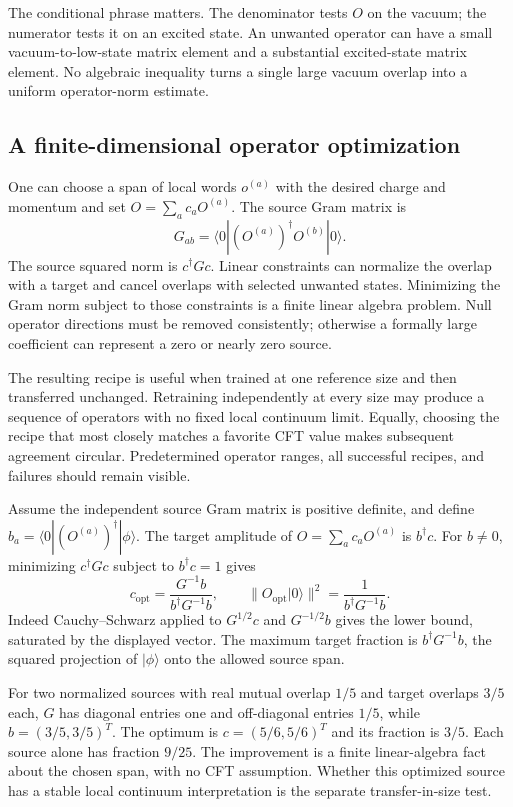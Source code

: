 The conditional phrase matters. The denominator tests $O$ on the vacuum;
the numerator tests it on an excited state. An unwanted operator can have
a small vacuum-to-low-state matrix element and a substantial excited-state
matrix element. No algebraic inequality turns a single large vacuum
overlap into a uniform operator-norm estimate.

\subsection{A finite-dimensional operator optimization}

One can choose a span of local words $o^{(a)}$ with the desired charge and
momentum and set $O=\sum_ac_aO^{(a)}$. The source Gram matrix is
\[
 G_{ab}=\langle0|(O^{(a)})^\dagger O^{(b)}|0\rangle.
\]
The source squared norm is $c^\dagger Gc$. Linear constraints can normalize the
overlap with a target and cancel overlaps with selected unwanted states.
Minimizing the Gram norm subject to those constraints is a finite linear
algebra problem. Null operator directions must be removed consistently;
otherwise a formally large coefficient can represent a zero or nearly
zero source.

The resulting recipe is useful when trained at one reference size and
then transferred unchanged. Retraining independently at every size may
produce a sequence of operators with no fixed local continuum limit.
Equally, choosing the recipe that most closely matches a favorite CFT
value makes subsequent agreement circular. Predetermined operator ranges,
all successful recipes, and failures should remain visible.

\begin{example}
Assume the independent source Gram matrix is positive definite,
and define $b_a=\langle0|(O^{(a)})^\dagger|\phi\rangle$.
The target amplitude of $O=\sum_ac_aO^{(a)}$ is $b^\dagger c$.
For $b\ne0$, minimizing $c^\dagger Gc$ subject to
$b^\dagger c=1$ gives
\[
 c_{\mathrm{opt}}=\frac{G^{-1}b}{b^\dagger G^{-1}b},\qquad
 \|O_{\mathrm{opt}}|0\rangle\|^2
 =\frac1{b^\dagger G^{-1}b}.
\]
Indeed Cauchy--Schwarz applied to $G^{1/2}c$ and $G^{-1/2}b$
gives the lower bound, saturated by the displayed vector. The
maximum target fraction is $b^\dagger G^{-1}b$, the squared
projection of $|\phi\rangle$ onto the allowed source span.

For two normalized sources with real mutual overlap $1/5$ and
target overlaps $3/5$ each, $G$ has diagonal entries one and
off-diagonal entries $1/5$, while $b=(3/5,3/5)^T$.
The optimum is $c=(5/6,5/6)^T$ and its fraction is $3/5$.
Each source alone has fraction $9/25$. The improvement is a
finite linear-algebra fact about the chosen span, with no CFT
assumption. Whether this optimized source has a stable local
continuum interpretation is the separate transfer-in-size test.
\end{example}

